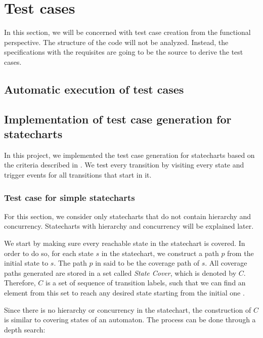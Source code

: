 \chapter{Test cases}
\label{cap:testgen}

In this section, we will be concerned with test case creation from the functional perspective. The structure of the code will not be analyzed. Instead, the specifications with the requisites are going to be the source to derive the test cases.





\section{Automatic execution of test cases}

\section{Implementation of test case generation for statecharts}
\label{implementTestGen}

In this project, we implemented the test case generation for statecharts based on the criteria described in \cite{bogdanov}. We test every transition by visiting every state and trigger events for all transitions that start in it. 

\subsection{Test case for simple statecharts}
\label{testSimpeState}

For this section, we consider only statecharts that do not contain hierarchy and concurrency. Statecharts with hierarchy and concurrency will be explained later.


We start by making sure every reachable state in the statechart is covered. In order to do so, for each state $s$ in the statechart, we construct a path $p$ from the initial state to $s$. The path $p$ in said to be the coverage path of $s$. All coverage paths generated are stored in a set called \textit{State Cover}, which is denoted by $C$. Therefore, $C$ is a set of sequence of transition labels, such that we can find an element from this set to reach any desired state starting from the initial one \cite{bogdanov}.

Since there is no hierarchy or concurrency in the statechart, the construction of $C$ is similar to covering states of an automaton. The process can be done through a depth search:

